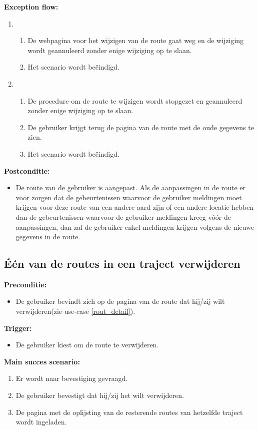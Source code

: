\documentclass[11pt,twoside,a4paper]{article}
\newcommand{\subpunt}[1]{
	\noindent
	\textbf{\small{#1}}
}
\newenvironment{precond}{
	\subpunt{Preconditie:}
	\begin{itemize}[label={}]
}{
	\end{itemize}
}
\newenvironment{trigger}{
	\subpunt{Trigger:}
	\begin{itemize}[label={}]
}{
	\end{itemize}
}
\newenvironment{mainss}{
	\subpunt{Main succes scenario:}
	\begin{enumerate}
}{
	\end{enumerate}
}
\newenvironment{except}{
	\subpunt{Exception flow:}
	\begin{enumerate}
}{
	\end{enumerate}
}
\newenvironment{postcond}{
	\subpunt{Postconditie:}
	\begin{itemize}[label={}]
}{
	\end{itemize}
}
\newcommand{\flowidx}{0}
\newcounter{nstap}
\newcommand{\flowtitle}[1]{					%
	\setcounter{nstap}{0}
	\item[\flowidx.][\emph{#1}]
}
\newcommand{\flowstap}{ 					%
	\stepcounter{nstap}
	\item[\flowidx.\arabic{nstap}]
}
\newenvironment{flow}[2]{					
	\renewcommand{\flowidx}{#1}
	
	\flowtitle{#2}
	\begin{enumerate}
}{
	\end{enumerate}
}
\begin{document}
	\begin{except}
		\begin{flow}{\ref{chge_rout_save} - \ref{chge_rout_end}}{De gebruiker verlaat de webpagina en/of gaat naar een andere webpagina.}
			\flowstap De webpagina voor het wijzigen van de route gaat weg en de wijziging wordt geannuleerd zonder enige wijziging op te slaan.
			\flowstap Het scenario wordt be\"eindigd.
		\end{flow}
		
		\begin{flow}{\ref{chge_rout_save} - \ref{chge_rout_end}}{De gebruiker annuleert zijn wijzigingen.} 
			\flowstap De procedure om de route te wijzigen wordt stopgezet en geannuleerd zonder enige wijziging op te slaan.
			\flowstap De gebruiker krijgt terug de pagina van de route met de oude gegevens te zien.
			\flowstap Het scenario wordt be\"eindigd.
		\end{flow}
	\end{except}
	
	\begin{postcond}
	\item De route van de gebruiker is aangepast. Als de aanpassingen in de route er voor zorgen dat de gebeurtenissen waarvoor de gebruiker meldingen moet krijgen voor deze route van een andere aard zijn of een andere locatie hebben dan de gebeurtenissen waarvoor de gebruiker meldingen kreeg v\'o\'or de aanpassingen, dan zal de gebruiker enkel meldingen krijgen volgens de nieuwe gegevens in de route.
	\end{postcond}
	
	
	\subsection{\'E\'en van de routes in een traject verwijderen}
	
	\begin{precond}
		\item De gebruiker bevindt zich op de pagina van de route dat hij/zij wilt verwijderen(zie use-case \ref{rout_detail}).
	\end{precond}
	
	\begin{trigger}
		\item De gebruiker kiest om de route te verwijderen.
	\end{trigger}
	
	\begin{mainss}
		\item Er wordt naar bevestiging gevraagd.
		\item De gebruiker bevestigt dat hij/zij het wilt verwijderen.\label{del_rout_bev}
		\item De pagina met de oplijsting van de resterende routes van hetzelfde traject wordt ingeladen.\label{del_rout_end}
	\end{mainss}
	
\end{document}
